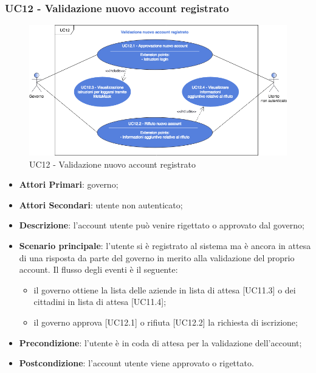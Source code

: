 \subsubsection{UC12 - Validazione nuovo account registrato}
\begin{figure}[h]
	\includegraphics[width=15.5cm]{res/images/UC12Validazione.png} %
	\centering
	\caption{UC12 - Validazione nuovo account registrato}
	
\end{figure}
\begin{itemize}
	\item \textbf{Attori Primari}:
	governo;
	\item \textbf{Attori Secondari}:
	utente non autenticato;
	\item \textbf{Descrizione}: l'account utente può venire rigettato o approvato dal governo;
	\item \textbf{Scenario principale}: l'utente si è registrato al sistema ma è ancora in attesa di una risposta da parte del governo in merito alla validazione del proprio account. Il flusso degli eventi è il seguente:
	\begin{itemize}
		\item il governo ottiene la lista delle aziende in lista di attesa [UC11.3] o dei cittadini in lista di attesa [UC11.4];
		\item il governo approva [UC12.1] o rifiuta [UC12.2] la richiesta di iscrizione;
	\end{itemize}
	\item \textbf{Precondizione}: l'utente è in coda di attesa per la validazione dell'account;
	\item \textbf{Postcondizione}: l'account utente viene approvato o rigettato. 
\end{itemize}
